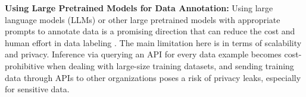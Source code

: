

\textbf{Using Large Pretrained Models for Data Annotation:} Using large language models (LLMs) or other large pretrained models with appropriate prompts to annotate data is a promising direction that can reduce the cost and human effort in data labeling \cite{smith2022language, wang-etal-2021-want-reduce}. %
The main limitation here is in terms of scalability and privacy. Inference via querying an API for every data example becomes cost-prohibitive when dealing with large-size training datasets, and sending training data through APIs to other organizations poses a risk of privacy leaks, especially for sensitive data.
 



%
